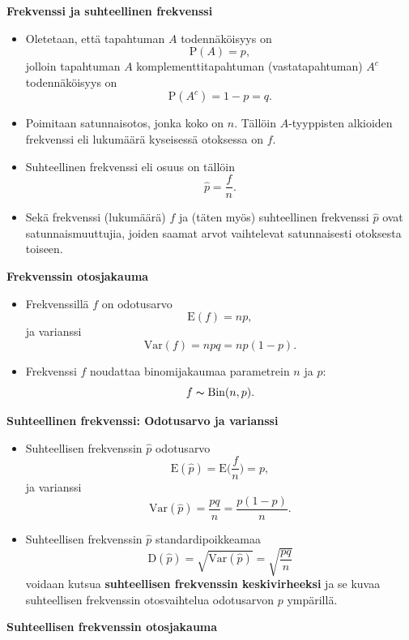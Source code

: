 \documentclass[
]{book}
\providecommand{\tightlist}{%
  \setlength{\itemsep}{0pt}\setlength{\parskip}{0pt}}
\begin{document}
\textbf{Frekvenssi ja suhteellinen frekvenssi}

\begin{itemize}
\item
  Oletetaan, että tapahtuman \(A\) todennäköisyys on
  \[
  \text{P}(A) = p,
  \]
  jolloin tapahtuman \(A\) komplementtitapahtuman (vastatapahtuman) \(A^c\) todennäköisyys on
  \[
  \text{P}(A^c) = 1- p = q.
  \]
\item
  Poimitaan satunnaisotos, jonka koko on \(n\). Tällöin \(A\)-tyyppisten alkioiden frekvenssi eli lukumäärä kyseisessä otoksessa on \(f\).
\item
  Suhteellinen frekvenssi eli osuus on tällöin
  \[
  \widehat{p} = \frac{f}{n}.
  \]
\item
  Sekä frekvenssi (lukumäärä) \(f\) ja (täten myös) suhteellinen frekvenssi \(\widehat{p}\) ovat satunnaismuuttujia, joiden saamat arvot vaihtelevat satunnaisesti otoksesta toiseen.
\end{itemize}

\textbf{Frekvenssin otosjakauma}

\begin{itemize}
\tightlist
\item
  Frekvenssillä \(f\) on odotusarvo
  \[
  \text{E}(f) = np,
  \]
  ja varianssi
  \[
  \mathrm{Var}(f) = npq = np(1-p).
  \]
\item
  Frekvenssi \(f\) noudattaa binomijakaumaa parametrein \(n\) ja \(p\):
  \[
  f \thicksim \mathrm{Bin}(n,p).
  \]
\end{itemize}

\textbf{Suhteellinen frekvenssi: Odotusarvo ja varianssi}

\begin{itemize}
\item
  Suhteellisen frekvenssin \(\widehat{p}\) odotusarvo
  \[
  \text{E}(\widehat{p}) = \text{E} \Big(\frac{f}{n} \Big) = p,
  \]
  ja varianssi
  \[
  \mathrm{Var}(\widehat{p}) = \frac{pq}{n} = \frac{p(1-p)}{n}.
  \]
\item
  Suhteellisen frekvenssin \(\widehat{p}\) standardipoikkeamaa
  \[
  \text{D}(\widehat{p}) = \sqrt{\mathrm{Var} (\widehat{p})} =  \sqrt{\frac{pq}{n}}
  \]
  voidaan kutsua \textbf{suhteellisen frekvenssin keskivirheeksi} ja se kuvaa suhteellisen frekvenssin otosvaihtelua odotusarvon \(p\) ympärillä.
\end{itemize}

\textbf{Suhteellisen frekvenssin otosjakauma}
\end{document}
